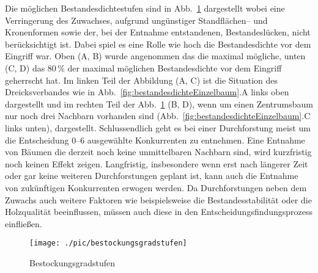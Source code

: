 \documentclass[twocolumn]{scrartcl}
\begin{document}
Die möglichen Bestandesdichtestufen sind in Abb.~\ref{fig:bestockungsgradstufen}
dargestellt wobei eine Verringerung des Zuwachses, aufgrund ungünstiger
Standflächen-- und Kronenformen sowie der, bei der Entnahme entstandenen,
Bestandeslücken, nicht berücksichtigt ist. Dabei spiel es eine Rolle wie hoch
die Bestandesdichte vor dem Eingriff war. Oben (A, B) wurde angenommen das die
maximal mögliche, unten (C, D) das 80\,\% der maximal möglichen Bestandesdichte
vor dem Eingriff geherrscht hat. Im linken Teil der Abbildung (A, C) ist die
Situation des Dreicksverbandes wie in Abb.~\ref{fig:bestandesdichteEinzelbaum}.A
links oben dargestellt und im rechten Teil der
Abb.~\ref{fig:bestockungsgradstufen} (B, D), wenn um einen Zentrumsbaum nur noch
drei Nachbarn vorhanden sind (Abb.~\ref{fig:bestandesdichteEinzelbaum}.C links
unten), dargestellt. Schlussendlich geht es bei einer Durchforstung meist um die
Entscheidung 0--6 ausgewählte Konkurrenten zu entnehmen. Eine Entnahme von
Bäumen die derzeit noch keine unmittelbaren Nachbarn sind, wird kurzfristig noch
keinen Effekt zeigen. Langfristig, insbesondere wenn erst nach längerer Zeit
oder gar keine weiteren Durchforstungen geplant ist, kann auch die Entnahme von
zukünftigen Konkurrenten erwogen werden. Da Durchforstungen neben dem Zuwachs
auch weitere Faktoren wie beispielsweise die Bestandesstabilität oder die
Holzqualität beeinflussen, müssen auch diese in den Entscheidungsfindungsprozess
einfließen.

\begin{figure}[htbp]
  \centering
  \texttt{[image: ./pic/bestockungsgradstufen]}
  \caption{Bestockungsgradstufen}
  \label{fig:bestockungsgradstufen}
\end{figure}
\end{document}
